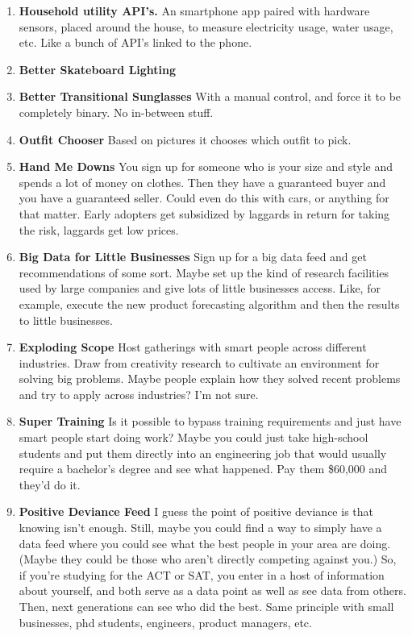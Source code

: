 \documentclass[paper=a4, fontsize=11pt]{scrartcl} %
\numberwithin{equation}{section} %
\numberwithin{figure}{section} %
\numberwithin{table}{section} %
\begin{document}
\begin{enumerate}
\item \textbf{Household utility API's.}  An smartphone app paired with hardware sensors, placed around the house, to measure electricity usage, water usage, etc.  Like a bunch of API's linked to the phone.

\item \textbf{Better Skateboard Lighting}

\item \textbf{Better Transitional Sunglasses}  With a manual control, and force it to be completely binary.  No in-between stuff.

\item \textbf{Outfit Chooser}  Based on pictures it chooses which outfit to pick.

\item \textbf{Hand Me Downs}  You sign up for someone who is your size and style and spends a lot of money on clothes.  Then they have a guaranteed buyer and you have a guaranteed seller.  Could even do this with cars, or anything for that matter.  Early adopters get subsidized by laggards in return for taking the risk, laggards get low prices.

\item \textbf{Big Data for Little Businesses}  Sign up for a big data feed and get recommendations of some sort.  Maybe set up the kind of research facilities used by large companies and give lots of little businesses access.  Like, for example, execute the new product forecasting algorithm and then the results to little businesses.

\item \textbf{Exploding Scope}  Host gatherings with smart people across different industries.  Draw from creativity research to cultivate an environment for solving big problems.  Maybe people explain how they solved recent problems and try to apply across industries?  I'm not sure.

\item \textbf{Super Training} Is it possible to bypass training requirements and just have smart people start doing work?  Maybe you could just take high-school students and put them directly into an engineering job that would usually require a bachelor's degree and see what happened.  Pay them \$60,000 and they'd do it.  

\item \textbf{Positive Deviance Feed}  I guess the point of positive deviance is that knowing isn't enough.  Still, maybe you could find a way to simply have a data feed where you could see what the best people in your area are doing.  (Maybe they could be those who aren't directly competing against you.)  So, if you're studying for the ACT or SAT, you enter in a host of information about yourself, and both serve as a data point as well as see data from others.  Then, next generations can see who did the best.  Same principle with small businesses, phd students, engineers, product managers, etc.


\end{enumerate}
\end{document}
